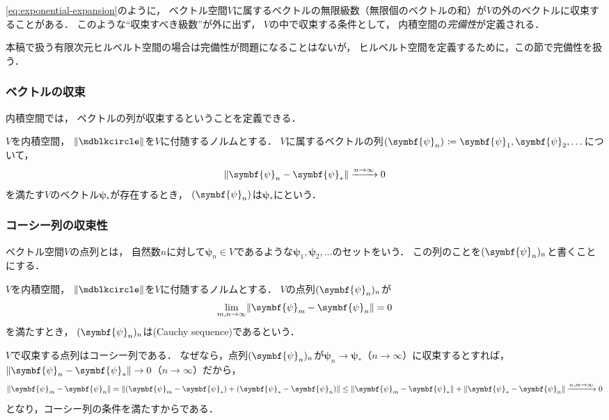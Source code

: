 \documentclass[
]{sotsu}
\newcommand{\bpsi}{\symbf{\psi}}
\begin{document}
\cref{eq:exponential-expansion}のように，
ベクトル空間$V$に属するベクトルの無限級数（無限個のベクトルの和）が$V$の外のベクトルに収束することがある．
このような``収束すべき級数''が外に出ず，
$V$の中で収束する条件として，
内積空間の\emph{完備性}が定義される．

本稿で扱う有限次元ヒルベルト空間の場合は完備性が問題になることはないが，
ヒルベルト空間を定義するために，この節で完備性を扱う．



\subsubsection{ベクトルの収束}

内積空間では，
ベクトルの列が収束するということを定義できる．

$V$を内積空間，
$\norm{\bigdot}$を$V$に付随するノルムとする．
$V$に属するベクトルの列$\sequ{\bpsi_n} \coloneq \bpsi_1, \bpsi_2, \dotsc$について，
\begin{equation*}
    \norm{\bpsi_n - \bpsi_*} \xrightarrow{n \to \infty} 0
\end{equation*}
を満たす$V$のベクトル$\bpsi_*$が存在するとき，
$\sequ{\bpsi_n}$は$\bpsi_*$にという．



\subsubsection{コーシー列の収束性}

ベクトル空間$V$の点列とは，
自然数$n$に対して$\bpsi_n \in V$であるような$\bpsi_1, \bpsi_2, \dots$のセットをいう．
この列のことを$\sequ{\bpsi_n}[n]$と書くことにする．

$V$を内積空間，
$\norm{\bigdot}$を$V$に付随するノルムとする．
$V$の点列$\sequ{\bpsi_n}[n]$が
\begin{equation*}
    \lim_{m, n \to \infty} \norm{\bpsi_m - \bpsi_n} = 0
\end{equation*}
を満たすとき，
$\sequ{\bpsi_n}[n]$は(Cauchy sequence)であるという．

$V$で収束する点列はコーシー列である．
なぜなら，点列$\sequ{\bpsi_n}[n]$が$\bpsi_n \to \bpsi_*$（$n \to \infty$）に収束するとすれば，
$\norm{\bpsi_n - \bpsi_*} \to 0$（$n \to \infty$）だから，
\begin{equation*}
    \norm{\bpsi_m - \bpsi_n}
    = \norm{(\bpsi_m - \bpsi_*) + (\bpsi_* - \bpsi_n)}
    \leq \norm{\bpsi_m - \bpsi_*} + \norm{\bpsi_* - \bpsi_n}
    \xrightarrow{n, m \to \infty} 0
\end{equation*}
となり，コーシー列の条件を満たすからである．
\end{document}
